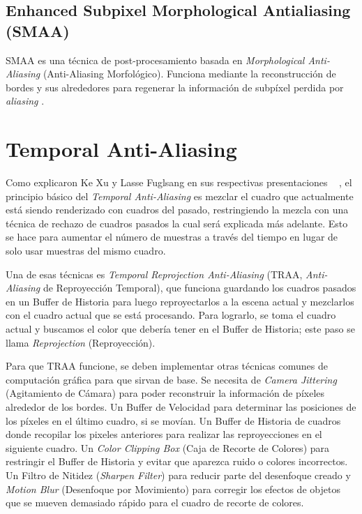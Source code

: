 \documentclass[pregrado]{tesis-usb} %
\begin{document}
\subsection{Enhanced Subpixel Morphological Antialiasing (SMAA)}
SMAA es una técnica de post-procesamiento basada en \textit{Morphological Anti-Aliasing} (Anti-Aliasing Morfológico). Funciona mediante la reconstrucción de bordes y sus alrededores para regenerar la información de subpíxel perdida por \textit{aliasing} \cite{Jimenez2012}.

\section{Temporal Anti-Aliasing}
Como explicaron Ke Xu y Lasse Fuglsang en sus respectivas presentaciones ~ \cite{XU2016, Fuglsand2016}, el principio básico del \textit{Temporal Anti-Aliasing} es mezclar el cuadro que actualmente está siendo renderizado con cuadros del pasado, restringiendo la mezcla con una técnica de rechazo de cuadros pasados la cual será explicada más adelante. Esto se hace para aumentar el número de muestras a través del tiempo en lugar de solo usar muestras del mismo cuadro.

Una de esas técnicas es \textit{Temporal Reprojection Anti-Aliasing}  (TRAA, \textit{Anti-Aliasing} de Reproyección Temporal), que funciona guardando los cuadros pasados en un Buffer de Historia para luego reproyectarlos a la escena actual y mezclarlos con el cuadro actual que se está procesando. Para lograrlo, se toma el cuadro actual y buscamos el color que debería tener en el Buffer de Historia; este paso se llama \textit{Reprojection} (Reproyección).

Para que TRAA funcione, se deben implementar otras técnicas comunes de computación gráfica para que sirvan de base. Se necesita de \textit{Camera Jittering} (Agitamiento de Cámara) para poder reconstruir la información de píxeles alrededor de los bordes. Un Buffer de Velocidad para determinar las posiciones de los píxeles en el último cuadro, si se movían. Un Buffer de Historia de cuadros donde recopilar los pixeles anteriores para realizar las reproyecciones en el siguiente cuadro. Un \textit{Color Clipping Box} (Caja de Recorte de Colores) para restringir el Buffer de Historia y evitar que aparezca ruido o colores incorrectos. Un Filtro de Nitidez (\textit{Sharpen Filter}) para reducir parte del desenfoque creado y \textit{Motion Blur} (Desenfoque por Movimiento) para corregir los efectos de objetos que se mueven demasiado rápido para el cuadro de recorte de colores.
\end{document}
